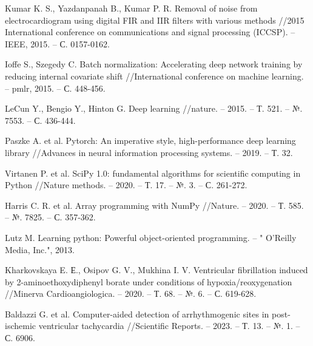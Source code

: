 \begin{thebibliography}{00}
    Kumar K. S., Yazdanpanah B., Kumar P. R. Removal of noise from
    electrocardiogram using digital FIR and IIR filters with various methods
    //2015 International conference on communications and signal processing
    (ICCSP). – IEEE, 2015. – С. 0157-0162.

    Ioffe S., Szegedy C. Batch normalization: Accelerating deep network
    training by reducing internal covariate shift //International conference on
    machine learning. – pmlr, 2015. – С. 448-456.

    LeCun Y., Bengio Y., Hinton G. Deep learning //nature. – 2015. – Т. 521. –
    №. 7553. – С. 436-444.

    Paszke A. et al. Pytorch: An imperative style, high-performance deep
    learning library //Advances in neural information processing systems. –
    2019. – Т. 32.

    Virtanen P. et al. SciPy 1.0: fundamental algorithms for scientific
    computing in Python //Nature methods. – 2020. – Т. 17. – №. 3. – С.
    261-272.

    Harris C. R. et al. Array programming with NumPy //Nature. – 2020. – Т.
    585. – №. 7825. – С. 357-362.

    Lutz M. Learning python: Powerful object-oriented programming. – " O'Reilly
    Media, Inc.", 2013.

    Kharkovskaya E. Е., Osipov G. V., Mukhina I. V. Ventricular fibrillation
    induced by 2-aminoethoxydiphenyl borate under conditions of
    hypoxia/reoxygenation //Minerva Cardioangiologica. – 2020. – Т. 68. – №. 6.
    – С. 619-628.

    Baldazzi G. et al. Computer-aided detection of arrhythmogenic sites in
    post-ischemic ventricular tachycardia //Scientific Reports. – 2023. – Т.
    13. – №. 1. – С. 6906.
\end{thebibliography}
\endgroup
